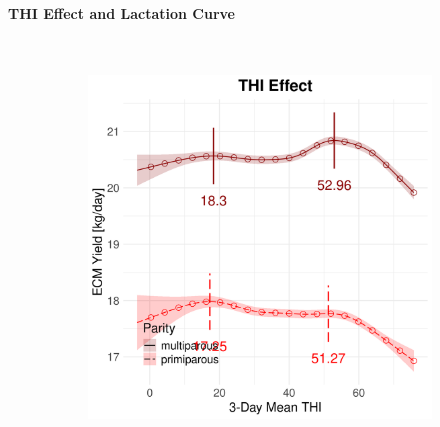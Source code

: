 \paragraph{THI Effect and Lactation Curve} \quad \\
\begin{figure}[H]
    \centering
    \begin{subfigure}[b]{0.45\textwidth}
        \centering
        \includegraphics[width=\textwidth]{thesis/figures/models/ecm/before2010/ob_ecm_before2010/ob_ecm_before2010_marginal_thi_milk_combined.png}
    \end{subfigure}
    \hspace{0.05\textwidth} %
    \begin{subfigure}[b]{0.45\textwidth}
        \centering

\end{subfigure}
\end{figure}
